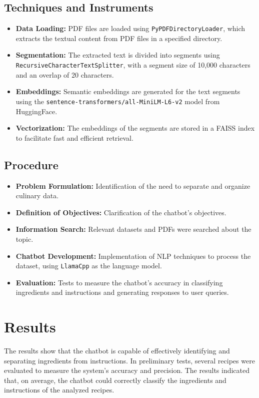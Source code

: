 \documentclass[conference]{IEEEtran}
\begin{document}
\subsection{Techniques and Instruments}
\begin{itemize}
    \item \textbf{Data Loading:} PDF files are loaded using \texttt{PyPDFDirectoryLoader}, which extracts the textual content from PDF files in a specified directory.
    \item \textbf{Segmentation:} The extracted text is divided into segments using \texttt{RecursiveCharacterTextSplitter}, with a segment size of 10,000 characters and an overlap of 20 characters.
    \item \textbf{Embeddings:} Semantic embeddings are generated for the text segments using the \texttt{sentence-transformers/all-MiniLM-L6-v2} model from HuggingFace.
    \item \textbf{Vectorization:} The embeddings of the segments are stored in a FAISS index to facilitate fast and efficient retrieval.
\end{itemize}

\subsection{Procedure}
\begin{itemize}
    \item \textbf{Problem Formulation:} Identification of the need to separate and organize culinary data.
    \item \textbf{Definition of Objectives:} Clarification of the chatbot's objectives.
    \item \textbf{Information Search:} Relevant datasets and PDFs were searched about the topic.
    \item \textbf{Chatbot Development:} Implementation of NLP techniques to process the dataset, using \texttt{LlamaCpp} as the language model.
    \item \textbf{Evaluation:} Tests to measure the chatbot's accuracy in classifying ingredients and instructions and generating responses to user queries.
\end{itemize}

\section{Results}

The results show that the chatbot is capable of effectively identifying and separating ingredients from instructions. In preliminary tests, several recipes were evaluated to measure the system's accuracy and precision. The results indicated that, on average, the chatbot could correctly classify the ingredients and instructions of the analyzed recipes.
\end{document}

